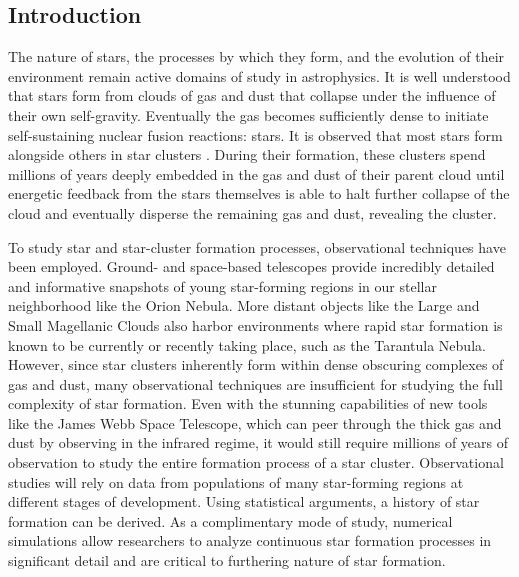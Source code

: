 \documentclass[twoside]{drexel-thesis}
\begin{document}
\begin{thesis}

\chapter{Introduction}

The nature of stars, the processes by which they form, and the evolution of their environment remain active domains of study in astrophysics. It is well understood that stars form from clouds of gas and dust that collapse under the influence of their own self-gravity. Eventually the gas becomes sufficiently dense to initiate self-sustaining nuclear fusion reactions: stars. It is observed that most stars form alongside others in star clusters \citep{lada_embedded_2003}. During their formation, these clusters spend millions of years deeply embedded in the gas and dust of their parent cloud until energetic feedback from the stars themselves is able to halt further collapse of the cloud and eventually disperse the remaining gas and dust, revealing the cluster. 

To study star and star-cluster formation processes, observational techniques have been employed. Ground- and space-based telescopes provide incredibly detailed and informative snapshots of young star-forming regions in our stellar neighborhood like the Orion Nebula. More distant objects like the Large and Small Magellanic Clouds also harbor environments where rapid star formation is known to be currently or recently taking place, such as the Tarantula Nebula. However, since star clusters inherently form within dense obscuring complexes of gas and dust, many observational techniques are insufficient for studying the full complexity of star formation. Even with the stunning capabilities of new tools like the James Webb Space Telescope, which can peer through the thick gas and dust by observing in the infrared regime, it would still require millions of years of observation to study the entire formation process of a star cluster. Observational studies will rely on data from populations of many star-forming regions at different stages of development. Using statistical arguments, a history of star formation can be derived. As a complimentary mode of study, numerical simulations allow researchers to analyze continuous star formation processes in significant detail and are critical to furthering nature of star formation.


\end{thesis}
\end{document}

